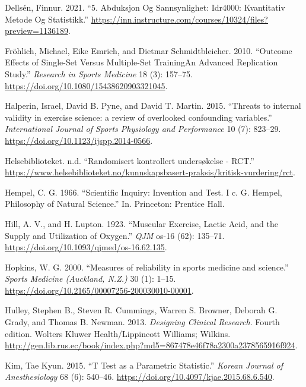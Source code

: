 \documentclass[
]{book}
\newlength{\cslhangindent}
\newlength{\cslentryspacingunit} %
\newenvironment{CSLReferences}[2] %
 {%
  \setlength{\parindent}{0pt}
  \ifodd #1
  \let\oldpar\par
  \def\par{\hangindent=\cslhangindent\oldpar}
  \fi
  \setlength{\parskip}{#2\cslentryspacingunit}
 }%
 {}
\begin{document}
\begin{CSLReferences}{1}{0}
\leavevmode{}%
Dellsén, Finnur. 2021. {``5. Abduksjon Og Sannsynlighet: Idr4000:
Kvantitativ Metode Og Statistikk.''}
\url{https://inn.instructure.com/courses/10324/files?preview=1136189}.

\leavevmode{}%
Fröhlich, Michael, Eike Emrich, and Dietmar Schmidtbleicher. 2010.
{``Outcome Effects of Single-Set Versus Multiple-Set
Training{\textemdash}An Advanced Replication Study.''} \emph{Research in
Sports Medicine} 18 (3): 157--75.
\url{https://doi.org/10.1080/15438620903321045}.

\leavevmode{}%
Halperin, Israel, David B. Pyne, and David T. Martin. 2015. {``Threats
to internal validity in exercise science: a review of overlooked
confounding variables.''} \emph{International Journal of Sports
Physiology and Performance} 10 (7): 823--29.
\url{https://doi.org/10.1123/ijspp.2014-0566}.

\leavevmode{}%
Helsebiblioteket. n.d. {``Randomisert kontrollert undersøkelse - RCT.''}
\url{https://www.helsebiblioteket.no/kunnskapsbasert-praksis/kritisk-vurdering/rct}.

\leavevmode{}%
Hempel, C. G. 1966. {``Scientific Inquiry: Invention and Test. I c. G.
Hempel, Philosophy of Natural Science.''} In. Princeton: Prentice Hall.

\leavevmode{}%
Hill, A. V., and H. Lupton. 1923. {``Muscular Exercise, Lactic Acid, and
the Supply and Utilization of Oxygen.''} \emph{QJM} os-16 (62): 135--71.
\url{https://doi.org/10.1093/qjmed/os-16.62.135}.

\leavevmode{}%
Hopkins, W. G. 2000. {``Measures of reliability in sports medicine and
science.''} \emph{Sports Medicine (Auckland, N.Z.)} 30 (1): 1--15.
\url{https://doi.org/10.2165/00007256-200030010-00001}.

\leavevmode{}%
Hulley, Stephen B., Steven R. Cummings, Warren S. Browner, Deborah G.
Grady, and Thomas B. Newman. 2013. \emph{Designing Clinical Research}.
Fourth edition. Wolters Kluwer Health/Lippincott Williams; Wilkins.
\url{http://gen.lib.rus.ec/book/index.php?md5=867478e46f78a2300a2378565916f924}.

\leavevmode{}%
Kim, Tae Kyun. 2015. {``T Test as a Parametric Statistic.''}
\emph{Korean Journal of Anesthesiology} 68 (6): 540--46.
\url{https://doi.org/10.4097/kjae.2015.68.6.540}.


\end{CSLReferences}
\end{document}
